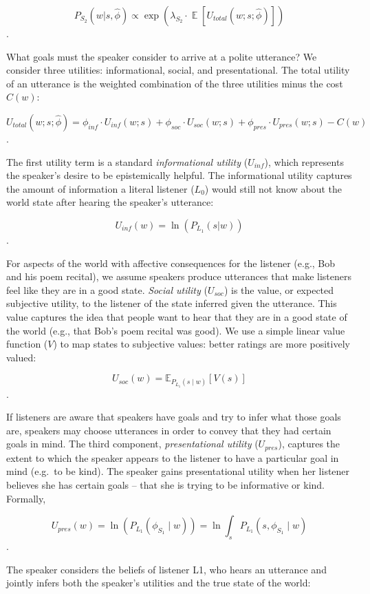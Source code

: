\documentclass[floatsintext,man]{apa6}
\theoremstyle{definition}
\theoremstyle{definition}
\theoremstyle{definition}
\theoremstyle{remark}
\begin{document}
\[P_{S_2}(w | s, \hat{\phi}) \propto \exp(\lambda_{S_2} \cdot \mathop{\mathbb{E}}[U_{total}(w; s; \hat{\phi})])\].

What goals must the speaker consider to arrive at a polite utterance? We
consider three utilities: informational, social, and presentational. The
total utility of an utterance is the weighted combination of the three
utilities minus the cost \(C(w)\):

\[U_{total}(w; s; \hat{\phi}) = \phi_{inf} \cdot U_{inf}(w; s) + \phi_{soc} \cdot U_{soc}(w; s) + \phi_{pres} \cdot U_{pres}(w; s) - C(w)\].

The first utility term is a standard \emph{informational utility}
(\(U_{inf}\)), which represents the speaker's desire to be epistemically
helpful. The informational utility captures the amount of information a
literal listener (\(L_0\)) would still not know about the world state
after hearing the speaker's utterance:

\[U_{inf}(w) = \ln(P_{L_1}(s | w))\].

For aspects of the world with affective consequences for the listener
(e.g., Bob and his poem recital), we assume speakers produce utterances
that make listeners feel like they are in a good state. \emph{Social
utility} (\(U_{soc}\)) is the value, or expected subjective utility, to
the listener of the state inferred given the utterance. This value
captures the idea that people want to hear that they are in a good state
of the world (e.g., that Bob's poem recital was good). We use a simple
linear value function (\(V\)) to map states to subjective values: better
ratings are more positively valued:

\[U_{soc}(w) = \mathbb{E}_{P_{L_1}(s \mid w)}[V(s)]\].

If listeners are aware that speakers have goals and try to infer what
those goals are, speakers may choose utterances in order to convey that
they had certain goals in mind. The third component,
\emph{presentational utility} (\(U_{pres}\)), captures the extent to
which the speaker appears to the listener to have a particular goal in
mind (e.g.~to be kind). The speaker gains presentational utility when
her listener believes she has certain goals -- that she is trying to be
informative or kind. Formally,

\[U_{pres}(w) = \ln(P_{L_1}(\phi_{S_1} \mid w)) = \ln \int_s P_{L_1}(s, \phi_{S_1} \mid w)\].

The speaker considers the beliefs of listener L1, who hears an utterance
and jointly infers both the speaker's utilities and the true state of
the world:
\end{document}
